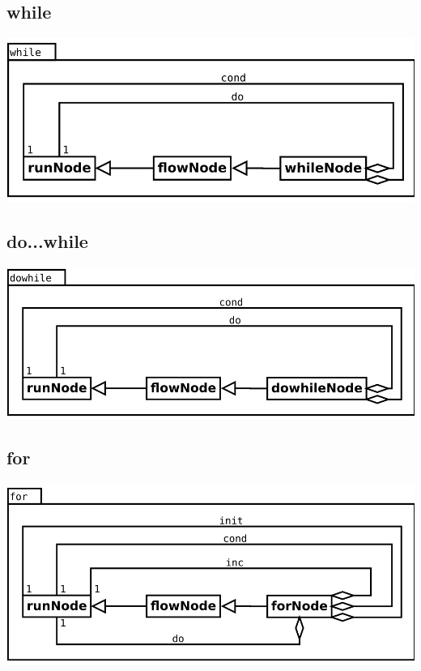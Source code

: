 \subsection{while}
\begin{center}
\includegraphics[scale=0.4]{while.png} \\
\end{center}


\subsection{do...while}
\begin{center}
\includegraphics[scale=0.4]{dowhile.png} \\
\end{center}

\subsection{for}
\begin{center}
\includegraphics[scale=0.4]{for.png} \\
\end{center}

